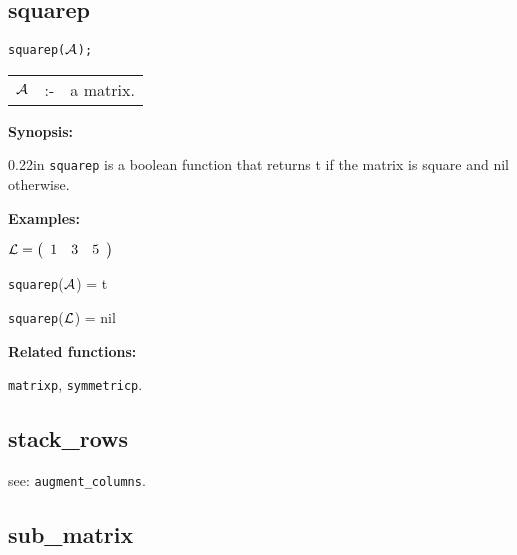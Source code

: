 \subsection{squarep}


\hspace*{0.175in} {\tt squarep(${\cal A}$);}

\hspace*{0.1in}  
\begin{tabular}{l l l} 
${\cal A}$ &:-& a matrix.
\end{tabular}

{\bf Synopsis:} %

\begin{addtolength}{\leftskip}{0.22in}
{\tt squarep} is a boolean function that returns t if 
                the matrix is square and nil otherwise.

\end{addtolength}

{\bf Examples:}

\begin{flushleft}
\hspace*{0.175in}
\begin{math}  
{\cal L} = \left( \begin{array}{ccc} 1 & 3 & 5 
\end{array} \right)
\end{math}  
\end{flushleft}

\vspace*{0.1in}

\hspace*{0.175in} {\tt squarep}(${\cal A}$) = t 

\hspace*{0.175in} {\tt squarep}(${\cal L}$) = nil

{\bf Related functions:}

\hspace*{0.175in} {\tt matrixp}, {\tt symmetricp}.


\subsection{stack\_rows}

\hspace*{0.175in} see: {\tt augment\_columns}.


\subsection{sub\_matrix}

